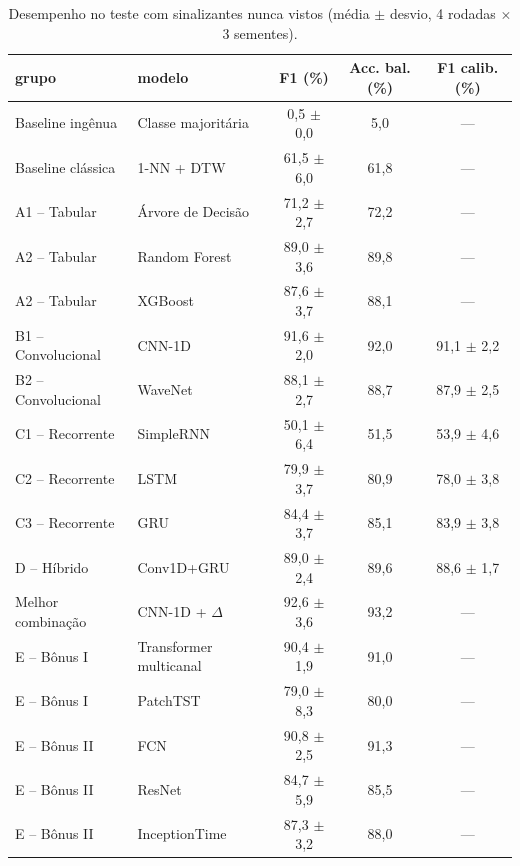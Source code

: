 \begin{table}[t]
\centering\footnotesize
\caption{Desempenho no teste com sinalizantes nunca vistos (média $\pm$ desvio, 4 rodadas $\times$ 3 sementes).}\label{tab:geral}
\begin{tabular}{llccc}
\toprule
grupo & modelo & F1 (\%) & Acc. bal. (\%) & F1 calib. (\%) \\
\midrule
Baseline ingênua & Classe majoritária & 0{,}5 $\pm$ 0{,}0 & 5{,}0 & — \\
Baseline clássica & 1-NN + DTW & 61{,}5 $\pm$ 6{,}0 & 61{,}8 & — \\
A1 -- Tabular & Árvore de Decisão & 71{,}2 $\pm$ 2{,}7 & 72{,}2 & — \\
A2 -- Tabular & Random Forest & 89{,}0 $\pm$ 3{,}6 & 89{,}8 & — \\
A2 -- Tabular & XGBoost & 87{,}6 $\pm$ 3{,}7 & 88{,}1 & — \\
B1 -- Convolucional & CNN-1D & 91{,}6 $\pm$ 2{,}0 & 92{,}0 & 91{,}1 $\pm$ 2{,}2 \\
B2 -- Convolucional & WaveNet & 88{,}1 $\pm$ 2{,}7 & 88{,}7 & 87{,}9 $\pm$ 2{,}5 \\
C1 -- Recorrente & SimpleRNN & 50{,}1 $\pm$ 6{,}4 & 51{,}5 & 53{,}9 $\pm$ 4{,}6 \\
C2 -- Recorrente & LSTM & 79{,}9 $\pm$ 3{,}7 & 80{,}9 & 78{,}0 $\pm$ 3{,}8 \\
C3 -- Recorrente & GRU & 84{,}4 $\pm$ 3{,}7 & 85{,}1 & 83{,}9 $\pm$ 3{,}8 \\
D -- Híbrido & Conv1D+GRU & 89{,}0 $\pm$ 2{,}4 & 89{,}6 & 88{,}6 $\pm$ 1{,}7 \\
Melhor combinação & CNN-1D + $\Delta$ & 92{,}6 $\pm$ 3{,}6 & 93{,}2 & — \\
E -- Bônus I & Transformer multicanal & 90{,}4 $\pm$ 1{,}9 & 91{,}0 & — \\
E -- Bônus I & PatchTST & 79{,}0 $\pm$ 8{,}3 & 80{,}0 & — \\
E -- Bônus II & FCN & 90{,}8 $\pm$ 2{,}5 & 91{,}3 & — \\
E -- Bônus II & ResNet & 84{,}7 $\pm$ 5{,}9 & 85{,}5 & — \\
E -- Bônus II & InceptionTime & 87{,}3 $\pm$ 3{,}2 & 88{,}0 & — \\
\bottomrule
\end{tabular}
\end{table}
